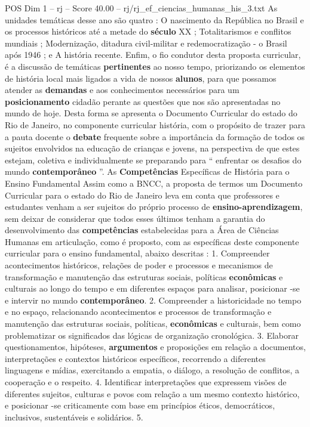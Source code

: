 \begin{textsample}{POS Dim 1 – rj – Score 40.00 – rj/rj\_ef\_ciencias\_humanas\_his\_3.txt}
As unidades temáticas desse ano são quatro : O nascimento da República no Brasil e os processos históricos até a metade do \textbf{século} XX ; Totalitarismos e conflitos mundiais ; Modernização, ditadura civil-militar e redemocratização - o Brasil após 1946 ; e A história recente.
Enfim, o fio condutor desta proposta curricular, é a discussão de temáticas \textbf{pertinentes} ao nosso tempo, priorizando os elementos de história local mais ligados a vida de nossos \textbf{alunos}, para que possamos atender as \textbf{demandas} e aos conhecimentos necessários para um \textbf{posicionamento} cidadão perante as questões que nos são apresentadas no mundo de hoje.
Desta forma se apresenta o Documento Curricular do estado do Rio de Janeiro, no componente curricular história, com o propósito de trazer para a pauta docente o \textbf{debate} frequente sobre a importância da formação de todos os sujeitos envolvidos na educação de crianças e jovens, na perspectiva de que estes estejam, coletiva e individualmente se preparando para “ enfrentar os desafios do mundo \textbf{contemporâneo} ”.
As \textbf{Competências} Específicas de História para o Ensino Fundamental Assim como a BNCC, a proposta de termos um Documento Curricular para o estado do Rio de Janeiro leva em conta que professores e estudantes venham a ser sujeitos do próprio processo de \textbf{ensino-aprendizagem}, sem deixar de considerar que todos esses últimos tenham a garantia do desenvolvimento das \textbf{competências} estabelecidas para a Área de Ciências Humanas em articulação, como é proposto, com as específicas deste componente curricular para o ensino fundamental, abaixo descritas : 1.
Compreender acontecimentos históricos, relações de poder e processos e mecanismos de transformação e manutenção das estruturas sociais, políticas \textbf{econômicas} e culturais ao longo do tempo e em diferentes espaços para analisar, posicionar -se e intervir no mundo \textbf{contemporâneo}. 2.
Compreender a historicidade no tempo e no espaço, relacionando acontecimentos e processos de transformação e manutenção das estruturas sociais, políticas, \textbf{econômicas} e culturais, bem como problematizar os significados das lógicas de organização cronológica. 3.
Elaborar questionamentos, hipóteses, \textbf{argumentos} e proposições em relação a documentos, interpretações e contextos históricos específicos, recorrendo a diferentes linguagens e mídias, exercitando a empatia, o diálogo, a resolução de conflitos, a cooperação e o respeito. 4.
Identificar interpretações que expressem visões de diferentes sujeitos, culturas e povos com relação a um mesmo contexto histórico, e posicionar -se criticamente com base em princípios éticos, democráticos, inclusivos, sustentáveis e solidários. 5.

\end{textsample}
